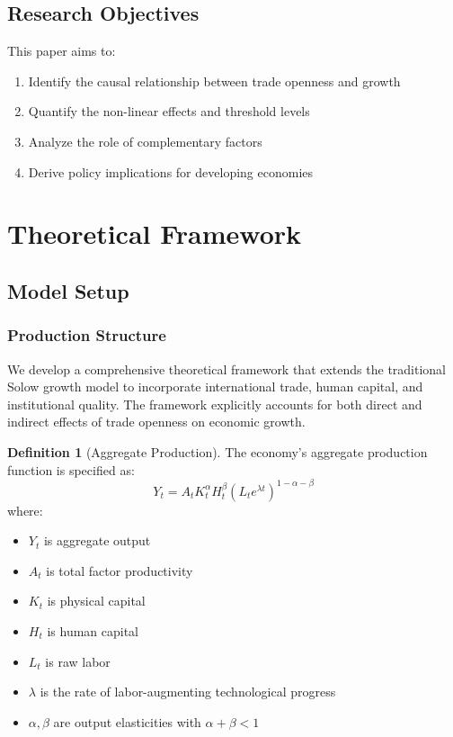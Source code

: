 \documentclass[12pt,a4paper]{article}
\theoremstyle{definition}
\newtheorem{definition}{Definition}
\begin{document}
\subsection{Research Objectives}
This paper aims to:
\begin{enumerate}
    \item Identify the causal relationship between trade openness and growth
    \item Quantify the non-linear effects and threshold levels
    \item Analyze the role of complementary factors
    \item Derive policy implications for developing economies
\end{enumerate}

\section{Theoretical Framework}
\subsection{Model Setup}
\subsubsection{Production Structure}
We develop a comprehensive theoretical framework that extends the traditional Solow growth model to incorporate international trade, human capital, and institutional quality. The framework explicitly accounts for both direct and indirect effects of trade openness on economic growth.

\begin{definition}[Aggregate Production]
The economy's aggregate production function is specified as:
\begin{equation}
Y_t = A_t K_t^\alpha H_t^\beta (L_t e^{\lambda t})^{1-\alpha-\beta}
\end{equation}
where:
\begin{itemize}
    \item $Y_t$ is aggregate output
    \item $A_t$ is total factor productivity
    \item $K_t$ is physical capital
    \item $H_t$ is human capital
    \item $L_t$ is raw labor
    \item $\lambda$ is the rate of labor-augmenting technological progress
    \item $\alpha, \beta$ are output elasticities with $\alpha + \beta < 1$
\end{itemize}
\end{definition}
\end{document}
